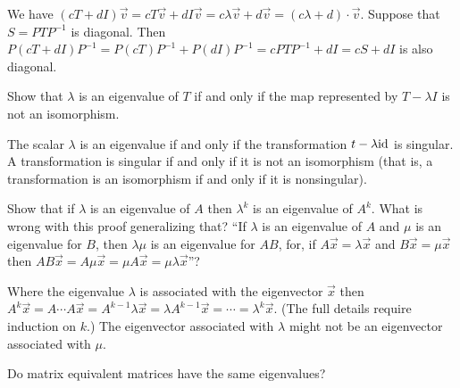 \begin{exercises}
    \begin{answer}
      \begin{exparts}
        \partsitem We have 
          $(cT+dI)\vec{v}=cT\vec{v}+dI\vec{v}=c\lambda\vec{v}+d\vec{v}
               =(c\lambda+d)\cdot \vec{v}$.
        \partsitem Suppose that $S=PTP^{-1}$ is diagonal.
          Then $P(cT+dI)P^{-1}=P(cT)P^{-1}+P(dI)P^{-1}
                 =cPTP^{-1}+dI=cS+dI$ is also diagonal.
      \end{exparts}
    \end{answer}
  \recommended \item
    Show that \( \lambda \) is an eigenvalue of \( T \) if and only if the map
    represented by \( T-\lambda I \) is not an isomorphism.
    \begin{answer}
      The scalar $\lambda$ is an eigenvalue if and only if the transformation
      $t-\lambda \mbox{id}$ is singular.
      A transformation is singular if and only if it is not an isomorphism
      (that is, a transformation is an isomorphism if and only if it is
      nonsingular).
    \end{answer}
  \item \cite{Strang} 
    \begin{exparts}
      \partsitem Show that if \( \lambda \) is an eigenvalue of \( A \)
         then \( \lambda^k \) is an eigenvalue of \( A^k \).
      \partsitem What is wrong with this proof generalizing that?
         ``If \( \lambda \) is an eigenvalue of \( A \) and \( \mu \) is
         an eigenvalue for \( B \), then \( \lambda\mu \) is an eigenvalue
         for \( AB \), for, if \( A\vec{x}=\lambda\vec{x} \) and
         \( B\vec{x}=\mu\vec{x} \) then
         \( AB\vec{x}=A\mu\vec{x}=\mu A\vec{x}=\mu\lambda\vec{x} \)''?
    \end{exparts}
    \begin{answer}
      \begin{exparts}
        \partsitem Where the eigenvalue $\lambda$ is associated with the
          eigenvector $\vec{x}$ then
          $A^k\vec{x}=A\cdots A\vec{x}=A^{k-1}\lambda\vec{x}
            =\lambda A^{k-1}\vec{x}=\cdots=\lambda^k\vec{x}$.
          (The full details require induction on $k$.)
        \partsitem The eigenvector associated with $\lambda$
          might not be an eigenvector associated with $\mu$.
      \end{exparts}
    \end{answer}
  \item 
    Do matrix equivalent matrices have the same eigenvalues?

\end{exercises}
